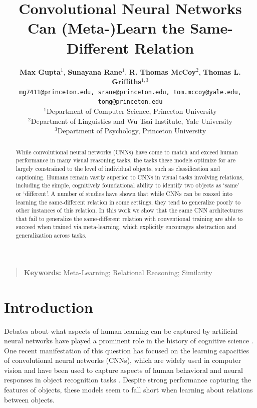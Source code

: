 \documentclass[10pt,letterpaper]{article}
\title{Convolutional Neural Networks Can (Meta-)Learn the Same-Different Relation}
\author{
    {\large \bf Max Gupta}$^1$,
    {\large \bf Sunayana Rane}$^1$,
    {\large \bf R. Thomas McCoy}$^2$,
    {\large \bf Thomas L. Griffiths}$^{1,3}$ \\ 
    \texttt{mg7411@princeton.edu, srane@princeton.edu, tom.mccoy@yale.edu, tomg@princeton.edu} \\
    $^1$Department of Computer Science, Princeton University \\
    $^2$Department of Linguistics and Wu Tsai Institute, Yale University \\
    $^3$Department of Psychology, Princeton University
}
\begin{document}
\newcommand{\mccoy}[1]{\textcolor{blue}{\textbf{McCoy: #1}}}
\newcommand{\griffiths}[1]{\textcolor{red}{\textbf{Griffiths: #1}}}

\maketitle



\begin{abstract}
While convolutional neural networks (CNNs) have come to match and exceed human performance in many visual reasoning tasks, the tasks these models optimize for are largely constrained to the level of individual objects, such as classification and captioning. Humans remain vastly superior to CNNs in visual tasks involving relations, including the simple, cognitively foundational ability to identify two objects as `same' or `different'. A number of studies have shown that while CNNs can be coaxed into learning the same-different relation in some settings, they tend to generalize poorly to other instances of this relation. In this work we show that the same CNN architectures that fail to generalize the same-different relation with conventional training are able to succeed when trained via meta-learning, which explicitly encourages abstraction and generalization across tasks.   

\end{abstract}

\begin{quote}
\small
\textbf{Keywords:} 
Meta-Learning; Relational Reasoning; Similarity
\end{quote}

\section{Introduction}

Debates about what aspects of human learning can be captured by artificial neural networks have played a prominent role in the history of cognitive science \cite{minsky1969introduction, rumelhart1986learning, pinker1988language, fodor1988connectionism}. One recent manifestation of this question has focused on the learning capacities of convolutional neural networks (CNNs), which are widely used in computer vision and have been used to capture aspects of human behavioral and neural responses in object recognition tasks \cite{kubilius2019brain, peterson2018evaluating}. Despite strong performance capturing the features of objects, these models seem to fall short when learning about relations between objects. 
\end{document}
